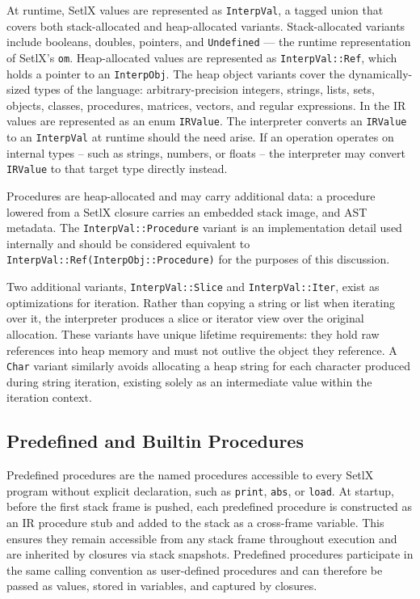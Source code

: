 At runtime, SetlX values are represented as \texttt{InterpVal}, a tagged union that covers both stack-allocated and heap-allocated variants. Stack-allocated variants include booleans, doubles, pointers, and \texttt{Undefined} --- the runtime representation of SetlX's \texttt{om}. Heap-allocated values are represented as \texttt{InterpVal::Ref}, which holds a pointer to an \texttt{InterpObj}. The heap object variants cover the dynamically-sized types of the language: arbitrary-precision integers, strings, lists, sets, objects, classes, procedures, matrices, vectors, and regular expressions. In the \ac{IR} values are represented as an enum \texttt{IRValue}. The interpreter converts an \texttt{IRValue} to an \texttt{InterpVal} at runtime should the need arise. If an operation operates on internal types -- such as strings, numbers, or floats -- the interpreter may convert \texttt{IRValue} to that target type directly instead.

Procedures are heap-allocated and may carry additional data: a procedure lowered from a SetlX closure carries an embedded stack image, and \ac{AST} metadata. The \texttt{InterpVal::Procedure} variant is an implementation detail used internally and should be considered equivalent to \texttt{InterpVal::Ref(InterpObj::Procedure)} for the purposes of this discussion. 

Two additional variants, \texttt{InterpVal::Slice} and \texttt{InterpVal::Iter}, exist as optimizations for iteration. Rather than copying a string or list when iterating over it, the interpreter produces a slice or iterator view over the original allocation. These variants have unique lifetime requirements: they hold raw references into heap memory and must not outlive the object they reference. A \texttt{Char} variant similarly avoids allocating a heap string for each character produced during string iteration, existing solely as an intermediate value within the iteration context. 

\subsection{Predefined and Builtin Procedures}

Predefined procedures are the named procedures accessible to every SetlX program without explicit declaration, such as \texttt{print}, \texttt{abs}, or \texttt{load}. At startup, before the first stack frame is pushed, each predefined procedure is constructed as an IR procedure stub and added to the stack as a cross-frame variable. This ensures they remain accessible from any stack frame throughout execution and are inherited by closures via stack snapshots. Predefined procedures participate in the same calling convention as user-defined procedures and can therefore be passed as values, stored in variables, and captured by closures.


